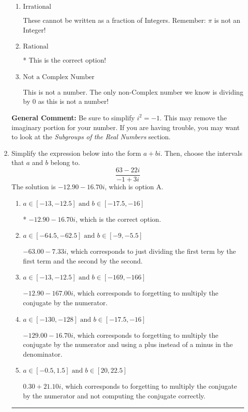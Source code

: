 \documentclass{extbook}[14pt]
\newcommand{\litem}[1]{\item #1

\rule{\textwidth}{0.4pt}}
\begin{document}
\begin{enumerate}
{\begin{enumerate}[label=\Alph*.]
This is a Complex number $(a+bi)$ that \textbf{only} has an imaginary part like $2i$.
\item \( \text{Irrational} \)

These cannot be written as a fraction of Integers. Remember: $\pi$ is not an Integer!
\item \( \text{Rational} \)

* This is the correct option!
\item \( \text{Not a Complex Number} \)

This is not a number. The only non-Complex number we know is dividing by 0 as this is not a number!
\end{enumerate}

\textbf{General Comment:} Be sure to simplify $i^2 = -1$. This may remove the imaginary portion for your number. If you are having trouble, you may want to look at the \textit{Subgroups of the Real Numbers} section.
}
\litem{
Simplify the expression below into the form $a+bi$. Then, choose the intervals that $a$ and $b$ belong to.
\[ \frac{63 - 22 i}{-1 + 3 i} \]The solution is \( -12.90  - 16.70 i \), which is option A.\begin{enumerate}[label=\Alph*.]
\item \( a \in [-13, -12.5] \text{ and } b \in [-17.5, -16] \)

* $-12.90  - 16.70 i$, which is the correct option.
\item \( a \in [-64.5, -62.5] \text{ and } b \in [-9, -5.5] \)

 $-63.00  - 7.33 i$, which corresponds to just dividing the first term by the first term and the second by the second.
\item \( a \in [-13, -12.5] \text{ and } b \in [-169, -166] \)

 $-12.90  - 167.00 i$, which corresponds to forgetting to multiply the conjugate by the numerator.
\item \( a \in [-130, -128] \text{ and } b \in [-17.5, -16] \)

 $-129.00  - 16.70 i$, which corresponds to forgetting to multiply the conjugate by the numerator and using a plus instead of a minus in the denominator.
\item \( a \in [-0.5, 1.5] \text{ and } b \in [20, 22.5] \)

 $0.30  + 21.10 i$, which corresponds to forgetting to multiply the conjugate by the numerator and not computing the conjugate correctly.
\end{enumerate}

}
\end{enumerate}
\end{document}
